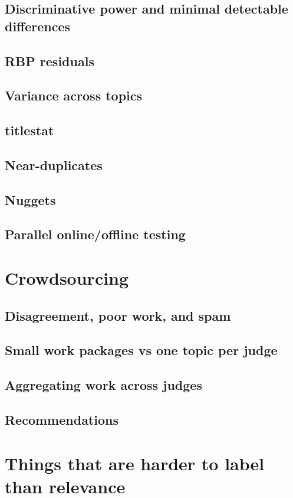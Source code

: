 \documentclass[nobib]{tufte-book}
\begin{document}
\section{Discriminative power and minimal detectable differences}
\section{RBP residuals}
\section{Variance across topics}
\section{titlestat}
\section{Near-duplicates}
\section{Nuggets}
\section{Parallel online/offline testing}

\chapter{Crowdsourcing}

\section{Disagreement, poor work, and spam}
\section{Small work packages vs one topic per judge}
\section{Aggregating work across judges}
\section{Recommendations}

\chapter{Things that are harder to label than relevance}
\end{document}
